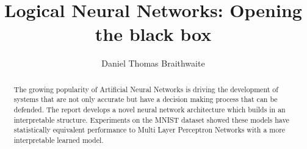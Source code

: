 \documentclass[11pt
              , a4paper
              , openright
              ]{report}
\title{Logical Neural Networks: Opening the black box}
\author{Daniel Thomas Braithwaite}
\date{}
\theoremstyle{definition}
\begin{document}
\frontmatter



\begin{abstract}

The growing popularity of Artificial Neural Networks is driving the development of systems that are not only accurate but have a decision making process that can be defended. The report develops a novel neural network architecture which builds in an interpretable structure. Experiments on the MNIST dataset showed these models have statistically equivalent performance to Multi Layer Perceptron Networks with a more interpretable learned model.

\end{abstract}


\maketitle


\tableofcontents



\mainmatter









\backmatter



%



%
\end{document}
